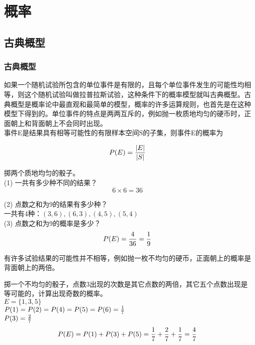 \chapter{概率}

\section{古典概型}

\subsection{古典概型}

如果一个随机试验所包含的单位事件是有限的，且每个单位事件发生的可能性均相等，则这个随机试验叫做拉普拉斯试验，这种条件下的概率模型就叫古典概型。古典概型是概率论中最直观和最简单的模型，概率的许多运算规则，也首先是在这种模型下得到的。单位事件的特点是两两互斥的，例如抛一枚质地均匀的硬币时，正面朝上和背面朝上不会同时出现。\\

事件E是结果具有相等可能性的有限样本空间S的子集，则事件E的概率为

\vspace{-1cm}

\begin{align}
	P(E) = {|E| \over |S|}
\end{align}

\begin{tcolorbox}
	掷两个质地均匀的骰子。\\
	(1) 一共有多少种不同的结果？
	$$
		6 \times 6 = 36
	$$

	(2) 点数之和为9的结果有多少种？\\
	一共有4种：$ (3, 6), (6, 3), (4, 5), (5, 4) $\\

	(3) 点数之和为9的概率是多少？
	$$
		P(E) = {4 \over 36} = {1 \over 9}
	$$
\end{tcolorbox}

有许多试验结果的可能性并不相等，例如抛一枚不均匀的硬币，正面朝上的概率是背面朝上的两倍。

\begin{tcolorbox}
	掷一个不均匀的骰子，点数3出现的次数是其它点数的两倍，其它五个点数出现是等可能的，计算出现奇数的概率。\\
	$ E = \{1, 3, 5\} $\\
	$ P(1) = P(2) = P(4) = P(5) = P(6) = {1 \over 7} $\\
	$ P(3) = {2 \over 7} $\\
	$$
		P(E) = P(1) + P(3) + P(5) = {1 \over 7} + {2 \over 7} + {1 \over 7} = {4 \over 7}
	$$
\end{tcolorbox}

